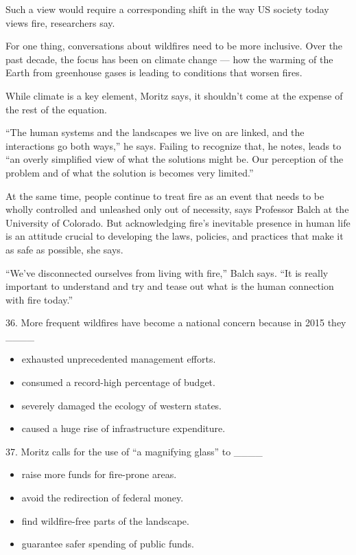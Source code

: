 \documentclass[UTF8,11pt]{ctexart}
\begin{document}
Such a view would require a corresponding shift in the way US society today views fire, researchers say.


For one thing, conversations about wildfires need to be more inclusive. Over the past decade, the focus has been on climate change — how the warming of the Earth from greenhouse gases is leading to conditions that worsen fires.


While climate is a key element, Moritz says, it shouldn’t come at the expense of the rest of the equation.


“The human systems and the landscapes we live on are linked, and the interactions go both ways,” he says. Failing to recognize that, he notes, leads to “an overly simplified view of what the solutions might be. Our perception of the problem and of what the solution is becomes very limited.”


At the same time, people continue to treat fire as an event that needs to be wholly controlled and unleashed only out of necessity, says Professor Balch at the University of Colorado. But acknowledging fire’s inevitable presence in human life is an attitude crucial to developing the laws, policies, and practices that make it as safe as possible, she says.


“We’ve disconnected ourselves from living with fire,” Balch says. “It is really important to understand and try and tease out what is the human connection with fire today.”


36. More frequent wildfires have become a national concern because in 2015 they \_\_\_\_


\begin{itemize}[leftmargin=2em,itemsep=.2em,topsep=.4em]\item[A.] exhausted unprecedented management efforts.
\item[B.] consumed a record-high percentage of budget.
\item[C.] severely damaged the ecology of western states.
\item[D.] caused a huge rise of infrastructure expenditure.
\end{itemize}

37. Moritz calls for the use of “a magnifying glass” to \_\_\_\_


\begin{itemize}[leftmargin=2em,itemsep=.2em,topsep=.4em]\item[A.] raise more funds for fire-prone areas.
\item[B.] avoid the redirection of federal money.
\item[C.] find wildfire-free parts of the landscape.
\item[D.] guarantee safer spending of public funds.
\end{itemize}
\end{document}
